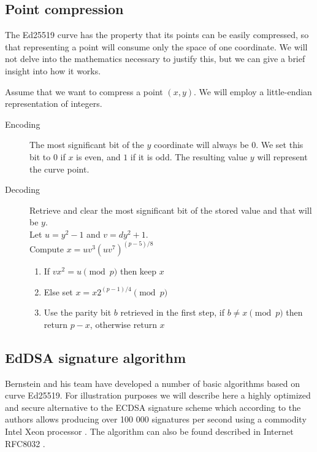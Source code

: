 \subsection{Point compression}

The Ed25519 curve has the property that its points can be easily compressed,
so that representing a point will consume only the space of one coordinate.
We will not delve into the mathematics necessary to justify this, but we can
give a brief insight into how it works.

Assume that we want to compress a point \((x, y)\).
We will employ a little-endian representation of integers.

\begin{description}
	
	
	\item[Encoding] The most significant bit of the \(y\) coordinate will always be \(0\).
	We set this bit to 0 if \(x\) is even, and \(1\) if it is odd.
	The resulting value \(y\) will represent the curve point.
	
	\item[Decoding] Retrieve and clear the most significant bit of the stored value and that will be \(y\).\\
	 Let \(u = y^2-1\) and \(v = d y^2  + 1\). \\
	 Compute \(x = u v^3 (u v^7)^{(p-5)/8}\)
	 \begin{enumerate}
	 \item If \(v x^2 = u \pmod p\) then keep \(x\)
	 \item Else set \(x = x 2^{(p-1)/4} \pmod p\)
	 \item Use the parity bit \(b\) retrieved in the first step, if \(b \ne x \pmod p \) then return \(p - x\),
	 otherwise return \(x\)
	 \end{enumerate}	
	
\end{description}


\subsection{EdDSA signature algorithm}

Bernstein and his team have developed a number of basic algorithms based on curve Ed25519.
For illustration purposes we will describe here a highly  optimized and secure alternative to the ECDSA signature scheme
which according to the authors allows producing over 100 000 signatures per second using a commodity Intel Xeon processor \cite{Bernstein2012}.
The algorithm can also be found described in Internet RFC8032 \cite{rfc8032}.

